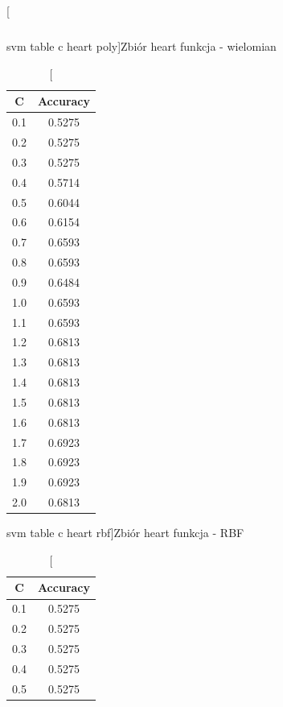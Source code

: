 \documentclass{classrep}
\begin{document}
{{\begin{table}[!htbp]
\begin{minipage}{.35\textwidth}
\begin{tabular}{|c|c|}
        \end{tabular}
        \caption
        [svm table c heart poly]{Zbiór heart funkcja - wielomian}
		\label{svm_table_c_heart_poly}
    \end{minipage}
    \hfill
    \begin{minipage}{.3\textwidth}
        \centering
        \begin{tabular}{|c|c|}
            \hline
			C & Accuracy \\ \hline
			0.1 & 0.5275 \\ \hline
			0.2 & 0.5275 \\ \hline
			0.3 & 0.5275 \\ \hline
			0.4 & 0.5714 \\ \hline
			0.5 & 0.6044 \\ \hline
			0.6 & 0.6154 \\ \hline
			0.7 & 0.6593 \\ \hline
			0.8 & 0.6593 \\ \hline
			0.9 & 0.6484 \\ \hline
			1.0 & 0.6593 \\ \hline
			1.1 & 0.6593 \\ \hline
			1.2 & 0.6813 \\ \hline
			1.3 & 0.6813 \\ \hline
			1.4 & 0.6813 \\ \hline
			1.5 & 0.6813 \\ \hline
			1.6 & 0.6813 \\ \hline
			1.7 & 0.6923 \\ \hline
			1.8 & 0.6923 \\ \hline
			1.9 & 0.6923 \\ \hline
			2.0 & 0.6813 \\ \hline
        \end{tabular}
        \caption
		[svm table c heart rbf]{Zbiór heart funkcja - RBF}
        \label{svm_table_c_heart_rbf}
    \end{minipage}
    \hfill
    \begin{minipage}{.3\textwidth}
        \centering
        \begin{tabular}{|c|c|}
            \hline
			C & Accuracy \\ \hline
			0.1 & 0.5275 \\ \hline
			0.2 & 0.5275 \\ \hline
			0.3 & 0.5275 \\ \hline
			0.4 & 0.5275 \\ \hline
			0.5 & 0.5275 \\ \hline

\end{tabular}
\end{minipage}
\end{table}}}
\end{document}
